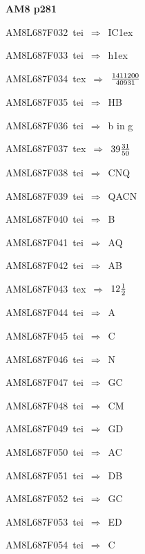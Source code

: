 \par\vfill\eject
{\bf\hfill AM8 p281\hfill\hbox{}}\par\bigskip
{\sixrm AM8L687F032\ {\sixit tei}\ }$\Rightarrow$\ IC\raise1ex\hbox{}\par\smallskip
{\sixrm AM8L687F033\ {\sixit tei}\ }$\Rightarrow$\ {\tenit h}\raise1ex\hbox{}\par\smallskip
{\sixrm AM8L687F034\ {\sixit tex}\ }$\Rightarrow$\ ${1411200\over 40931}$\par\smallskip
{\sixrm AM8L687F035\ {\sixit tei}\ }$\Rightarrow$\ HB\par\smallskip
{\sixrm AM8L687F036\ {\sixit tei}\ }$\Rightarrow$\ {\tenit b} {\tenit in} {\tenit g}\par\smallskip
{\sixrm AM8L687F037\ {\sixit tex}\ }$\Rightarrow$\ $39{{31\over 50}}$\par\smallskip
{\sixrm AM8L687F038\ {\sixit tei}\ }$\Rightarrow$\ CNQ\par\smallskip
{\sixrm AM8L687F039\ {\sixit tei}\ }$\Rightarrow$\ QACN\par\smallskip
{\sixrm AM8L687F040\ {\sixit tei}\ }$\Rightarrow$\ B\par\smallskip
{\sixrm AM8L687F041\ {\sixit tei}\ }$\Rightarrow$\ AQ\par\smallskip
{\sixrm AM8L687F042\ {\sixit tei}\ }$\Rightarrow$\ AB\par\smallskip
{\sixrm AM8L687F043\ {\sixit tex}\ }$\Rightarrow$\ $12{{1\over 2}}$\par\smallskip
{\sixrm AM8L687F044\ {\sixit tei}\ }$\Rightarrow$\ A\par\smallskip
{\sixrm AM8L687F045\ {\sixit tei}\ }$\Rightarrow$\ C\par\smallskip
{\sixrm AM8L687F046\ {\sixit tei}\ }$\Rightarrow$\ N\par\smallskip
{\sixrm AM8L687F047\ {\sixit tei}\ }$\Rightarrow$\ GC\par\smallskip
{\sixrm AM8L687F048\ {\sixit tei}\ }$\Rightarrow$\ CM\par\smallskip
{\sixrm AM8L687F049\ {\sixit tei}\ }$\Rightarrow$\ GD\par\smallskip
{\sixrm AM8L687F050\ {\sixit tei}\ }$\Rightarrow$\ AC\par\smallskip
{\sixrm AM8L687F051\ {\sixit tei}\ }$\Rightarrow$\ DB\par\smallskip
{\sixrm AM8L687F052\ {\sixit tei}\ }$\Rightarrow$\ GC\par\smallskip
{\sixrm AM8L687F053\ {\sixit tei}\ }$\Rightarrow$\ ED\par\smallskip
{\sixrm AM8L687F054\ {\sixit tei}\ }$\Rightarrow$\ C\par\smallskip

